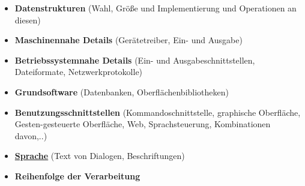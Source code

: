 \begin{itemize}
\item \textbf{Datenstrukturen} (Wahl, Größe und Implementierung und Operationen an diesen)
\item \textbf{Maschinennahe Details} (Gerätetreiber, Ein- und Ausgabe)
\item \textbf{Betriebssystemnahe Details} (Ein- und Ausgabeschnittstellen, Dateiformate, Netzwerkprotokolle)
\item \textbf{Grundsoftware} (Datenbanken, Oberflächenbibliotheken)
\item \textbf{Benutzungsschnittstellen} (Kommandoschnittstelle, graphische Oberfläche, Gesten-gesteuerte Oberfläche, Web, Sprachsteuerung, Kombinationen davon,..)
\item \textbf{\underline{Sprache}} (Text von Dialogen, Beschriftungen)
\item \textbf{Reihenfolge der Verarbeitung}
\end{itemize}